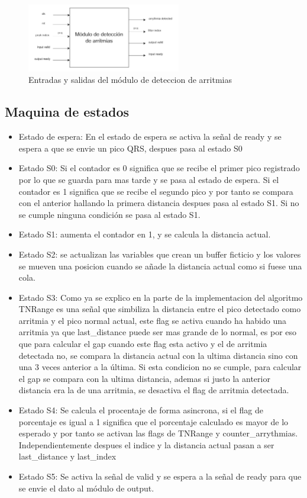 \begin{figure}[h!]
    \centering
    \includegraphics[width=0.6\textwidth]{./Images/img_implementacion_hw/moddeteccionarritmias.png}
    \caption{Entradas y salidas del módulo de deteccion de arritmias}
    \label{fig:moddeteccionarritmias}
\end{figure} 

\subsection{Maquina de estados}

\begin{itemize}
    \item Estado de espera: En el estado de espera se activa la señal de ready y se espera a que se envie un pico QRS, despues pasa al estado S0
    \item Estado S0: Si el contador es 0 significa que se recibe el primer pico registrado por lo que se guarda para mas tarde y se pasa al estado de espera.
    Si el contador es 1 significa que se recibe el segundo pico y por tanto se compara con el anterior hallando la primera distancia despues pasa al estado S1.
    Si no se cumple ninguna condición se pasa al estado S1.    
    \item Estado S1: aumenta el contador en 1, y se calcula la distancia actual.
    \item Estado S2: se actualizan las variables que crean un buffer ficticio y los valores se mueven una posicion cuando se añade la distancia actual como si fuese una cola.
    \item Estado S3: Como ya se explico en la parte de la implementacion del algoritmo TNRange es una señal que simbiliza la distancia entre el pico detectado como arritmia y 
    el pico normal actual, este flag se activa cuando ha habido una arritmia ya que last\_distance puede ser mas grande de lo normal, es por eso que para calcular el gap cuando este flag esta activo
     y el de arritmia detectada no, se compara la distancia actual con la ultima distancia sino con una 3 veces anterior a la última. Si esta condicion no se cumple, para calcular el gap se compara 
     con la ultima distancia, ademas si justo la anterior distancia era la de una arritmia, se desactiva el flag de arritmia detectada.
    \item Estado S4: Se calcula el procentaje de forma asincrona, si el flag de porcentaje es igual a 1 significa que el porcentaje calculado es mayor de lo esperado y por tanto se activan las flags
    de TNRange y counter\_arrythmias. Independientemente despues el indice y la distancia actual pasan a ser last\_distance y last\_index
    \item Estado S5: Se activa la señal de valid y se espera a la señal de ready para que se envie el dato al módulo de output.
\end{itemize}

